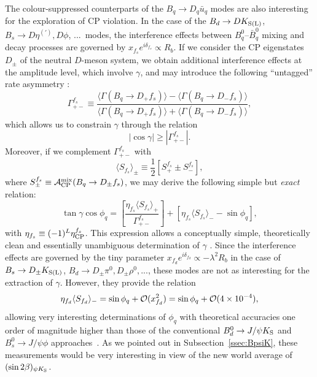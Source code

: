 \documentclass[11pt]{cernrep}
\begin{document}
The colour-suppressed counterparts
of the $B_q\to D_q \bar u_q$ modes are also interesting
for the exploration of CP violation. 
In the case of the $B_d\to D K_{\rm S(L)}$, $B_s\to D \eta^{(')}, D \phi$, ...\
modes, the interference effects between $B^0_q$--$\bar B^0_q$ mixing
and decay processes are governed by $x_{f_s}e^{i\delta_{f_s}}\propto R_b$.
If we consider the CP eigenstates $D_\pm$ of the neutral $D$-meson system, 
we obtain additional interference effects at the amplitude level, which involve 
$\gamma$, and may introduce the following ``untagged'' rate asymmetry 
\cite{RF-BdDpi0}:
\begin{equation}
\Gamma_{+-}^{f_s}\equiv
\frac{\langle\Gamma(B_q\to D_+ f_s)\rangle-\langle
\Gamma(B_q\to D_- f_s)\rangle}{\langle\Gamma(B_q\to D_+ f_s)\rangle
+\langle\Gamma(B_q\to D_- f_s)\rangle},
\end{equation}
which allows us to constrain $\gamma$ through the relation
\begin{equation}
|\cos\gamma|\geq |\Gamma_{+-}^{f_s}|. 
\end{equation}
Moreover, if we complement
$\Gamma_{+-}^{f_s}$ with 
\begin{equation}
\langle S_{f_s}\rangle_\pm\equiv \frac{1}{2}\left[S_+^{f_s}\pm S_-^{f_s}\right],
\end{equation}
where $S_\pm^{f_s}\equiv {\cal A}_{\rm CP}^{\rm mix}(B_q\to D_\pm f_s)$,
we may derive the following simple but {\it exact} relation:
\begin{equation}
\tan\gamma\cos\phi_q=
\left[\frac{\eta_{f_s} \langle S_{f_s}
\rangle_+}{\Gamma_{+-}^{f_s}}\right]+\left[\eta_{f_s}\langle S_{f_s}\rangle_--
\sin\phi_q\right],
\end{equation}
with $\eta_{f_s}\equiv(-1)^L\eta_{\rm CP}^{f_s}$. This expression allows 
a conceptually simple, theoretically clean and essentially unambiguous 
determination of $\gamma$ \cite{RF-BdDpi0}. Since the interference effects are 
governed by the tiny parameter $x_{f_d}e^{i\delta_{f_d}}\propto -\lambda^2R_b$
in the case of $B_s\to D_\pm K_{\rm S(L)}$, 
$B_d\to D_\pm \pi^0, D_\pm \rho^0, ...$, these modes are not as interesting 
for the extraction of $\gamma$. However, they provide the relation
\begin{equation}
\eta_{f_d}\langle S_{f_d}\rangle_-=\sin\phi_q + {\cal O}(x_{f_d}^2)
=\sin\phi_q + {\cal O}(4\times 10^{-4}),
\end{equation}
allowing very interesting determinations of $\phi_q$ with theoretical 
accuracies one order of magnitude higher than those of
the conventional  $B^0_d\to J/\psi K_{\rm S}$ and $B^0_s\to J/\psi \phi$
approaches~\cite{RF-BdDpi0}. As we pointed out in Subsection~\ref{ssec:BpsiK},
these measurements would be very interesting in view of the new world
average of $(\sin2\beta)_{\psi K_{\rm S}}$. 
\end{document}
